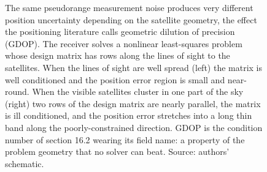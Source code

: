 \begin{figure}[ht]
\centering
{}
\caption[Geometric dilution of precision in positioning]{The same
pseudorange measurement noise produces very different position
uncertainty depending on the satellite geometry, the effect the
positioning literature calls geometric dilution of precision (GDOP). The
receiver solves a nonlinear least-squares problem whose design matrix has
rows along the lines of sight to the satellites. When the lines of sight
are well spread (left) the matrix is well conditioned and the position
error region is small and near-round. When the visible satellites cluster
in one part of the sky (right) two rows of the design matrix are nearly
parallel, the matrix is ill conditioned, and the position error stretches
into a long thin band along the poorly-constrained direction. GDOP is the
condition number of section 16.2 wearing its field name: a property of the
problem geometry that no solver can beat. Source: authors' schematic.}
\label{fig:vol02ch16:gps-gdop}
\end{figure}
